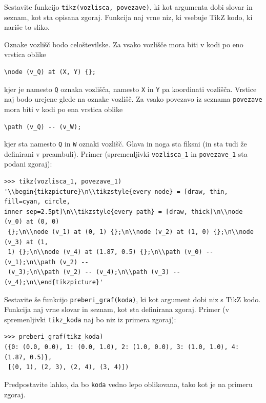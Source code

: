 \documentclass[arhiv]{../izpit}
\begin{document}
\podnaloga[15 točk]
Sestavite funkcijo \texttt{tikz(vozlisca, povezave)}, ki kot argumenta dobi slovar in seznam, kot sta opisana zgoraj. Funkcija naj vrne niz, ki vsebuje TikZ kodo, ki nariše to sliko.

Oznake vozlišč bodo celoštevilske. Za vsako vozlišče mora biti v kodi po eno vrstica oblike
\begin{lstlisting}[basicstyle=\ttfamily]
\node (v_Q) at (X, Y) {};
\end{lstlisting}
kjer je namesto \texttt{Q} oznaka vozlišča, namesto \texttt{X} in \texttt{Y} pa koordinati vozlišča. Vrstice naj bodo urejene glede na oznake vozlišč. Za vsako povezavo iz seznama \texttt{povezave} mora biti v kodi po ena vrstica oblike
\begin{lstlisting}[basicstyle=\ttfamily]
\path (v_Q) -- (v_W);
\end{lstlisting}
kjer sta namesto \texttt{Q} in \texttt{W} oznaki vozlišč. Glava in noga sta fiksni (in sta tudi že definirani v preambuli).
Primer (spremenljivki \texttt{vozlisca\_1} in \texttt{povezave\_1} sta podani zgoraj):
%
\lstset{basicstyle=\ttfamily,breaklines=true}
\begin{verbatim}
>>> tikz(vozlisca_1, povezave_1)
'\\begin{tikzpicture}\n\\tikzstyle{every node} = [draw, thin, fill=cyan, circle, 
inner sep=2.5pt]\n\\tikzstyle{every path} = [draw, thick]\n\\node (v_0) at (0, 0)
 {};\n\\node (v_1) at (0, 1) {};\n\\node (v_2) at (1, 0) {};\n\\node (v_3) at (1,
 1) {};\n\\node (v_4) at (1.87, 0.5) {};\n\\path (v_0) -- (v_1);\n\\path (v_2) --
 (v_3);\n\\path (v_2) -- (v_4);\n\\path (v_3) -- (v_4);\n\\end{tikzpicture}'
\end{verbatim}
%
\podnaloga[20 točk] Sestavite še funkcijo \texttt{preberi\_graf(koda)}, ki kot argument dobi niz s TikZ kodo. Funkcija naj vrne slovar in seznam, kot sta definirana zgoraj.
Primer (v spremenljivki \texttt{tikz\_koda} naj bo niz iz primera zgoraj):
%
\begin{verbatim}
>>> preberi_graf(tikz_koda)
({0: (0.0, 0.0), 1: (0.0, 1.0), 2: (1.0, 0.0), 3: (1.0, 1.0), 4: (1.87, 0.5)},
 [(0, 1), (2, 3), (2, 4), (3, 4)])
\end{verbatim}
%
Predpostavite lahko, da bo \texttt{koda} vedno lepo oblikovana, tako kot je na primeru zgoraj.
%
\end{document}
